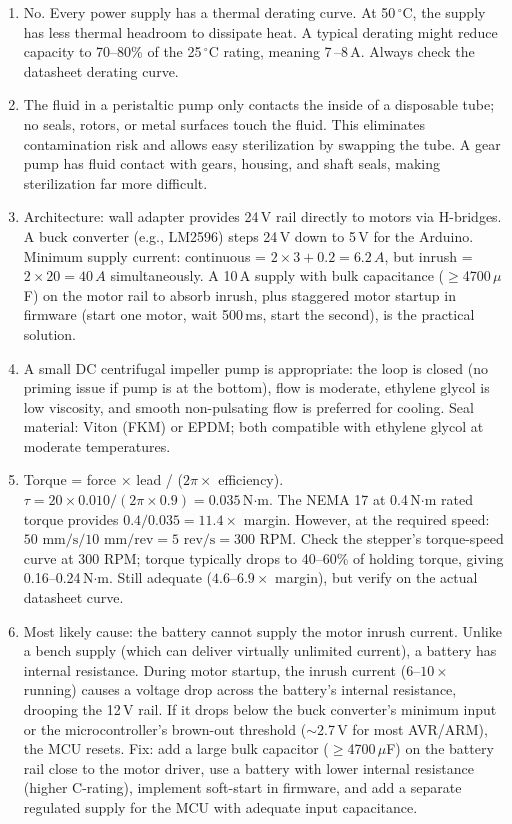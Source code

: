 \documentclass[11pt,letterpaper,twoside,openany]{book}
\begin{document}
\begin{enumerate}[leftmargin=1.5em]
  \item No. Every power supply has a thermal derating curve. At 50\,$^{\circ}$C, the supply has less thermal headroom to dissipate heat. A typical derating might reduce capacity to 70--80\% of the 25\,$^{\circ}$C rating, meaning 7\,--8\,A. Always check the datasheet derating curve.

  \item The fluid in a peristaltic pump only contacts the inside of a disposable tube; no seals, rotors, or metal surfaces touch the fluid. This eliminates contamination risk and allows easy sterilization by swapping the tube. A gear pump has fluid contact with gears, housing, and shaft seals, making sterilization far more difficult.

  \item Architecture: wall adapter provides 24\,V rail directly to motors via H-bridges. A buck converter (e.g., LM2596) steps 24\,V down to 5\,V for the Arduino. Minimum supply current: continuous = $2 \times 3 + 0.2 = 6.2\,A$, but inrush = $2 \times 20 = 40\,A$ simultaneously. A 10\,A supply with bulk capacitance ($\geq$4700\,$\mu$F) on the motor rail to absorb inrush, plus staggered motor startup in firmware (start one motor, wait 500\,ms, start the second), is the practical solution.

  \item A small DC centrifugal impeller pump is appropriate: the loop is closed (no priming issue if pump is at the bottom), flow is moderate, ethylene glycol is low viscosity, and smooth non-pulsating flow is preferred for cooling. Seal material: Viton (FKM) or EPDM; both compatible with ethylene glycol at moderate temperatures.

  \item Torque = force $\times$ lead / ($2\pi \times$ efficiency). $\tau = 20 \times 0.010 / (2\pi \times 0.9) = 0.035$\,N$\cdot$m. The NEMA 17 at 0.4\,N$\cdot$m rated torque provides $0.4 / 0.035 = 11.4\times$ margin. However, at the required speed: $50\text{ mm/s} / 10\text{ mm/rev} = 5\text{ rev/s} = 300\text{ RPM}$. Check the stepper's torque-speed curve at 300 RPM; torque typically drops to 40--60\% of holding torque, giving 0.16--0.24\,N$\cdot$m. Still adequate ($4.6$--$6.9\times$ margin), but verify on the actual datasheet curve.

  \item Most likely cause: the battery cannot supply the motor inrush current. Unlike a bench supply (which can deliver virtually unlimited current), a battery has internal resistance. During motor startup, the inrush current ($6$--$10\times$ running) causes a voltage drop across the battery's internal resistance, drooping the 12\,V rail. If it drops below the buck converter's minimum input or the microcontroller's brown-out threshold ($\sim$2.7\,V for most AVR/ARM), the MCU resets. Fix: add a large bulk capacitor ($\geq$4700\,$\mu$F) on the battery rail close to the motor driver, use a battery with lower internal resistance (higher C-rating), implement soft-start in firmware, and add a separate regulated supply for the MCU with adequate input capacitance.
\end{enumerate}
\end{document}
